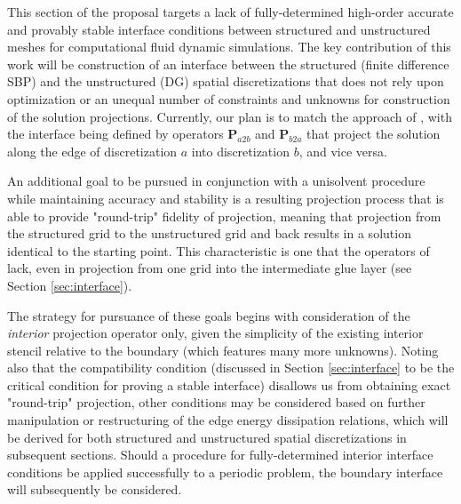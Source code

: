
This section of the proposal targets a lack of fully-determined high-order
accurate and provably stable interface conditions between structured and unstructured
meshes for computational fluid dynamic simulations. The key contribution of this work
will be construction of an interface between the structured (finite difference SBP)
and the unstructured (DG) spatial discretizations that does not rely upon
optimization or an unequal number of constraints and unknowns for construction
of the solution projections. Currently, our plan is to match the approach of
\cite{kozdon2016stable}, with the interface being defined by operators $\pmb{P}_{a2b}$
and $\pmb{P}_{b2a}$ that project the solution along the edge of discretization $a$
into discretization $b$, and vice versa.

An additional goal to be pursued in conjunction with a unisolvent procedure while
maintaining accuracy and stability is a resulting projection process that is able to
provide "round-trip" fidelity of projection, meaning that projection from the structured
grid to the unstructured grid and back results in a solution identical to the starting
point. This characteristic is one that the operators of \cite{kozdon2016stable} lack,
even in projection from one grid into the intermediate glue layer (see Section \ref{sec:interface}).

The strategy for pursuance of these goals begins with consideration of the
\emph{interior} projection operator only, given the simplicity of the existing
interior stencil relative to the boundary (which features many more unknowns).
Noting also that the compatibility condition (discussed in Section \ref{sec:interface} to be the
critical condition for proving a stable interface) disallows us from obtaining
exact "round-trip" projection, other conditions may be considered based
on further manipulation or restructuring of the edge energy dissipation relations,
which will be derived for both structured and unstructured spatial discretizations
in subsequent sections. Should a procedure for fully-determined interior interface
conditions be applied successfully to a periodic problem, the boundary interface
will subsequently be considered.


